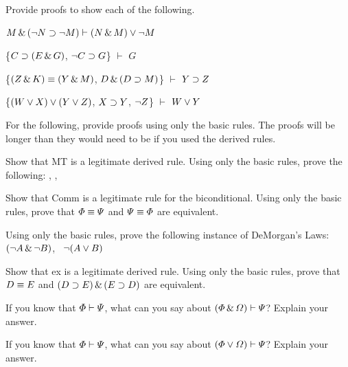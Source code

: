 \solutions
\problempart
\label{pr.solvedSLproofs2}
Provide proofs to show each of the following.
\begin{earg}
\item $M \,\&\, (\neg N \supset \neg M) \vdash (N \,\&\, M) \vee \neg M$
\item \{$C\supset(E\,\&\, G)$, $\neg C \supset G$\} $\vdash$ $G$
\item \{$(Z\,\&\, K)\equiv(Y\,\&\, M)$, $D\,\&\,(D\supset M)$\} $\vdash$ $Y\supset Z$
\item \{$(W \vee X) \vee (Y \vee Z)$, $X\supset Y$, $\neg Z$\} $\vdash$ $W\vee Y$
\end{earg}



\problempart
For the following, provide proofs using only the basic rules. The proofs will be longer than they would need to be if you used the derived rules.
\begin{earg}
\item Show that MT is a legitimate derived rule. Using only the basic rules, prove the following: \metaA{}\eif\metaB{}, \enot\metaB{}, \therefore\ \enot\metaA{}
\item Show that Comm is a legitimate rule for the biconditional. Using only the basic rules, prove that $\varPhi{}\equiv\varPsi{}$ and $\varPsi{}\equiv\varPhi{}$ are equivalent.
\item Using only the basic rules, prove the following instance of DeMorgan's Laws: $(\neg A \,\&\, \neg B)$, \therefore\ $\neg(A \vee B)$
\item Show that {\eiff}{ex} is a legitimate derived rule. Using only the basic rules, prove that $D\equiv E$ and $(D\supset E)\,\&\,(E\supset D)$ are equivalent.
\end{earg}




\problempart
\begin{earg}
\item If you know that $\varPhi{}\vdash\varPsi{}$, what can you say about $(\varPhi{}\,\&\,\varOmega{})\vdash\varPsi{}$? Explain your answer.
\item If you know that $\varPhi{}\vdash\varPsi{}$, what can you say about $(\varPhi{}\vee\varOmega{})\vdash\varPsi{}$? Explain your answer.
\end{earg}

